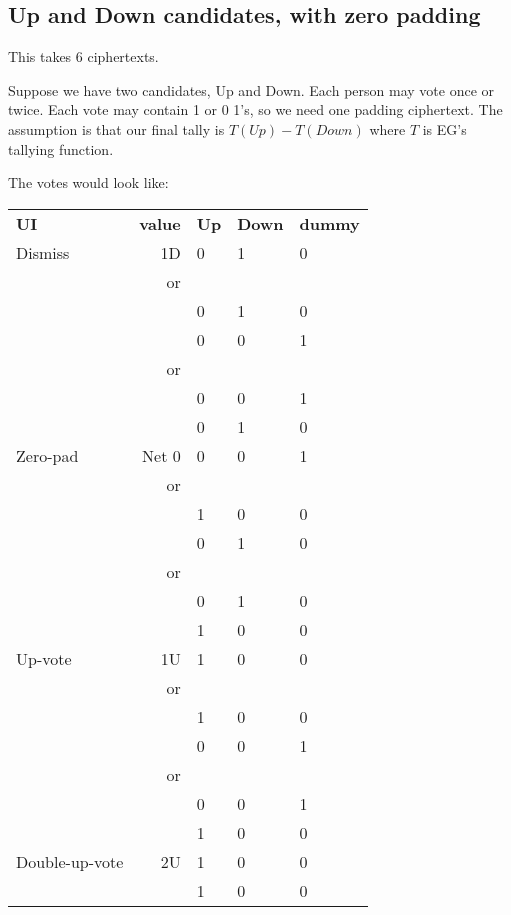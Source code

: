 \documentclass[10pt,a4paper]{article}
\begin{document}
\subsection{Up and Down candidates, with zero padding} \label{sec:upAndDown}
This takes 6 ciphertexts.

Suppose we have two candidates, Up and Down. Each person may vote once or twice. Each vote may contain 1 or 0 1's, so we need one padding ciphertext. The assumption is that our final tally is $T(\textit{Up}) - T(\textit{Down})$ where $T$ is EG's tallying function.

The votes would look like:

\begin{tabular}{lrlll}
	{\bf UI}  & {\bf value }&{\bf  Up}&{\bf  Down} &{\bf  dummy }\\
	Dismiss   & 1D          & 0          & 1    & 0\\
	& or  & & & \\		  
	&            & 0          & 1   & 0 \\ 
	&            & 0          & 0   & 1    \\ 
	& or  & & & \\		  
&            & 0          & 0   & 1    \\ 
&            & 0          & 1   & 0 \\  \hline
	Zero-pad	 & Net 0          & 0          & 0   & 1 \\
	& or  & & & \\
	&            & 1          & 0   & 0  \\
	&            & 0          & 1   & 0 \\   
	& or  & & & \\	
    &            & 0          & 1   & 0 \\
	&            & 1          & 0   & 0  \\ \hline
	
	Up-vote   & 1U          & 1          & 0   & 0 \\
	& or  & & & \\
	&            & 1          & 0  & 0  \\
	&            & 0          & 0 & 1    \\   
	& or  & & & \\
&            & 0          & 0 & 1    \\  
&            & 1          & 0  & 0  \\ \hline
	Double-up-vote & 2U          & 1          & 0  & 0  \\ 
	&            & 1          & 0  & 0  \\     \hline
\end{tabular}
\end{document}
